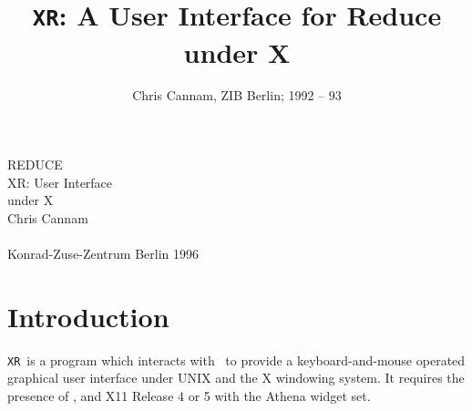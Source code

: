 \makeatletter


\makeatother

\def\xr{{\tt XR}}
\def\keybox#1{\raisebox{1.5pt}{\footnotesize\fbox{\vphantom{E}\smash{\sf #1}}}}

\renewcommand{\encodingdefault}{T1}
\renewcommand{\familydefault}{ptm}
\renewcommand{\rmdefault}{ptm}
\renewcommand{\sfdefault}{phv}
\renewcommand{\ttdefault}{pcr}
\renewcommand{\bfdefault}{b}

\setlength{\oddsidemargin}{5mm}
\setlength{\evensidemargin}{-5mm}
\setlength{\textwidth}{159.2mm}
\setlength{\textheight}{235mm}
\addtolength{\topmargin}{-18mm}

\title{{\tt XR}: A User Interface for Reduce under X}
\date{}
\author{Chris Cannam, ZIB Berlin; 1992 -- 93}
\sloppy

\pagestyle{empty}
\begin{titlepage}
  \vspace*{\fill}
  \nopagebreak
  \begin{center}
    \fontsize{70}{75pt}\selectfont
    REDUCE \\
    \fontsize{40}{65pt}\selectfont
    XR: User Interface\\
    under X\\[40mm]
    \LARGE
    Chris Cannam\\[45mm]
    \mbox{}\\[10mm]
    \Large
    Konrad-Zuse-Zentrum Berlin 1996
  \end{center}
\end{titlepage}

\pagestyle{headings}

\maketitle
\section{Introduction}

\xr\ is a program which interacts with \REDUCE\ to provide a
keyboard-and-mouse operated graphical user interface under UNIX and
the X windowing system.  It requires the presence of \REDUCE{}, and
X11 Release 4 or 5 with the Athena widget set.

